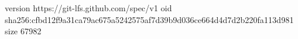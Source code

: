 version https://git-lfs.github.com/spec/v1
oid sha256:cfbd12f9a31ca79ac675a5242575af7d39b9d036ce664d4d7d2b220fa113d981
size 67982
